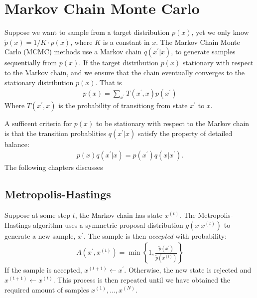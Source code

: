 \section{Markov Chain Monte Carlo}
Suppose we want to sample from a target distribution $p(x)$, yet we only know $\tilde{p}(x) = 1/K\cdot p(x)$, where $K$ is a constant in $x$.
The Markov Chain Monte Carlo (MCMC) methods use a Markov chain $q(x^\prime|x)$, to generate samples sequentially from $p(x)$. If the target distribution $p(x)$  stationary with respect to the Markov chain, and we ensure that the chain eventually converges to the stationary distribution $p(x)$. That is
\begin{align*}
    p(x) = \sum_{x^\prime} T(x^\prime, x) p(x^\prime)
\end{align*}
Where $T(x^\prime, x)$ is the probability of transitiong from state $x^\prime$ to $x$.


A sufficent criteria for $p(x)$ to be stationary with respect to the Markov chain is that the transition probablities $q(x^\prime|x)$ satisfy the property of detailed balance:
\begin{align*}
    p(x)q(x^\prime|x) = p(x^\prime)q(x|x^\prime).
\end{align*}
The following chapters discusses



\subsection{Metropolis-Hastings}
Suppose at some step $t$, the Markov chain has state $x^{(t)}$. The Metropolis-Hastings algorithm uses a symmetric proposal distribution $g(x|x^{(t)})$ to generate a new sample, $x^\prime$. The sample is then \emph{accepted} with probability:
\begin{align*}
    A(x^{\prime}, x^{(t)}) = \min\left\{1, \frac{\tilde{p}(x^\prime)}{\tilde{p}(x^{(t)})}\right\}
\end{align*}
If the sample is accepted, $x^{(t+1)} \gets x^\prime$. Otherwise, the new state is rejected and $x^{(t+1)} \gets x^{(t)}$. This process is then repeated until we have obtained the required amount of samples $x^{(1)},\dots,x^{(N)}$. 

